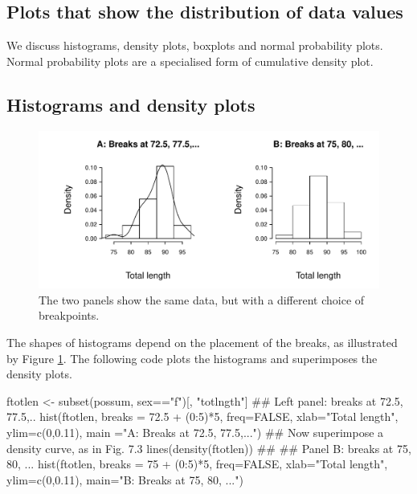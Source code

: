 \subsection{Plots that show the distribution of data values}
  We discuss
histograms, density plots, boxplots and normal probability plots.
Normal probability plots are a specialised form of cumulative
density plot.

\subsection*{Histograms and density plots}
\begin{figure}[htbp]
\begin{Schunk}


\centerline{\includegraphics[width=\textwidth]{figs/09-poss-hist-1} }

\end{Schunk}
 \caption{The two panels show the same data, but with a different
choice of breakpoints.\label{fig:densitybreaks}}
\vspace*{-15pt}
\end{figure}

The shapes of histograms depend on the placement of the breaks, as
illustrated by Figure \ref{fig:densitybreaks}.  The following code
plots the histograms and superimposes the density plots.
\begin{Schunk}
\begin{Sinput}
ftotlen <- subset(possum, sex=="f")[, "totlngth"]
## Left panel: breaks at 72.5, 77.5,..
hist(ftotlen, breaks = 72.5 + (0:5)*5, freq=FALSE,
     xlab="Total length", ylim=c(0,0.11),
     main ="A: Breaks at 72.5, 77.5,...")
## Now superimpose a density curve, as in Fig. 7.3
lines(density(ftotlen))
##
## Panel B: breaks at 75, 80, ...
hist(ftotlen, breaks = 75 + (0:5)*5, freq=FALSE,
     xlab="Total length", ylim=c(0,0.11),
     main="B: Breaks at 75, 80, ...")
\end{Sinput}
\end{Schunk}

